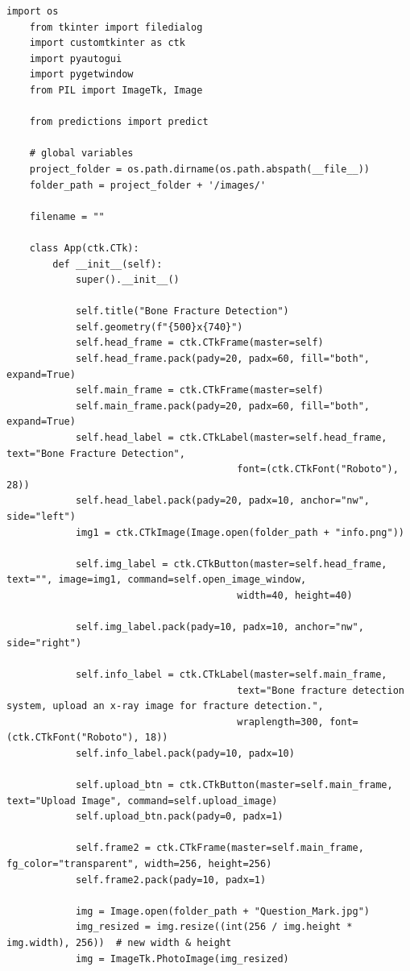 \documentclass[a4paper,12pt]{report}
\begin{document}
    \begin{lstlisting}[style=pythonstyle]
    import os
    from tkinter import filedialog
    import customtkinter as ctk
    import pyautogui
    import pygetwindow
    from PIL import ImageTk, Image

    from predictions import predict

    # global variables
    project_folder = os.path.dirname(os.path.abspath(__file__))
    folder_path = project_folder + '/images/'

    filename = ""

    class App(ctk.CTk):
        def __init__(self):
            super().__init__()

            self.title("Bone Fracture Detection")
            self.geometry(f"{500}x{740}")
            self.head_frame = ctk.CTkFrame(master=self)
            self.head_frame.pack(pady=20, padx=60, fill="both", expand=True)
            self.main_frame = ctk.CTkFrame(master=self)
            self.main_frame.pack(pady=20, padx=60, fill="both", expand=True)
            self.head_label = ctk.CTkLabel(master=self.head_frame, text="Bone Fracture Detection",
                                        font=(ctk.CTkFont("Roboto"), 28))
            self.head_label.pack(pady=20, padx=10, anchor="nw", side="left")
            img1 = ctk.CTkImage(Image.open(folder_path + "info.png"))

            self.img_label = ctk.CTkButton(master=self.head_frame, text="", image=img1, command=self.open_image_window,
                                        width=40, height=40)

            self.img_label.pack(pady=10, padx=10, anchor="nw", side="right")

            self.info_label = ctk.CTkLabel(master=self.main_frame,
                                        text="Bone fracture detection system, upload an x-ray image for fracture detection.",
                                        wraplength=300, font=(ctk.CTkFont("Roboto"), 18))
            self.info_label.pack(pady=10, padx=10)

            self.upload_btn = ctk.CTkButton(master=self.main_frame, text="Upload Image", command=self.upload_image)
            self.upload_btn.pack(pady=0, padx=1)

            self.frame2 = ctk.CTkFrame(master=self.main_frame, fg_color="transparent", width=256, height=256)
            self.frame2.pack(pady=10, padx=1)

            img = Image.open(folder_path + "Question_Mark.jpg")
            img_resized = img.resize((int(256 / img.height * img.width), 256))  # new width & height
            img = ImageTk.PhotoImage(img_resized)


\end{lstlisting}
\end{document}
